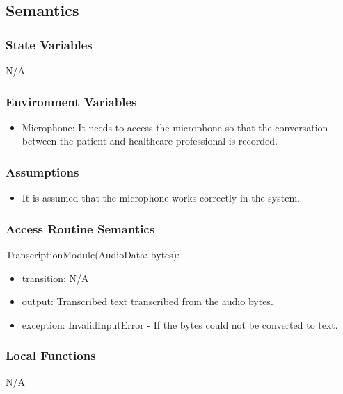 \documentclass[12pt, titlepage]{article}
\begin{document}
\subsection{Semantics}

\subsubsection{State Variables}

N/A

\subsubsection{Environment Variables}

\begin{itemize}
  \item Microphone: It needs to access the microphone so that the conversation between the patient and healthcare professional is recorded.
\end{itemize}

\subsubsection{Assumptions}

\begin{itemize}
  \item It is assumed that the microphone works correctly in the system.
\end{itemize}

\subsubsection{Access Routine Semantics}

\noindent TranscriptionModule(AudioData: bytes): 
\begin{itemize}
  \item transition: N/A
  \item output: Transcribed text transcribed from the audio bytes. 
  \item exception: InvalidInputError - If the bytes could not be converted to text.   
\end{itemize}

\subsubsection{Local Functions}

N/A

\newpage
~\newpage
  
\end{document}
